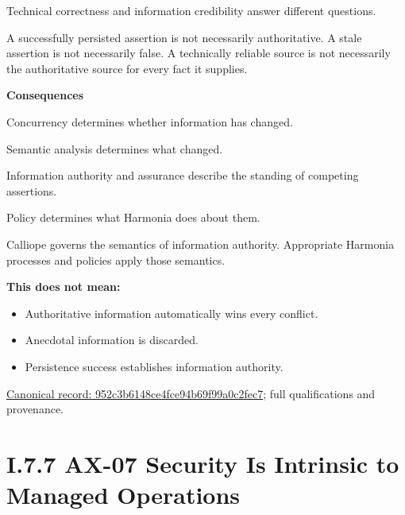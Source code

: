 Technical correctness and information credibility answer different
questions.



A successfully persisted assertion is not necessarily authoritative. A
stale assertion is not necessarily false. A technically reliable source
is not necessarily the authoritative source for every fact it supplies.



\par\medskip\textbf{Consequences}\par


Concurrency determines whether information has changed.



Semantic analysis determines what changed.



Information authority and assurance describe the standing of competing
assertions.



Policy determines what Harmonia does about them.



Calliope governs the semantics of information authority. Appropriate
Harmonia processes and policies apply those semantics.



\textbf{This does not mean:}



\begin{itemize}


\item Authoritative information automatically wins every conflict.

\item Anecdotal information is discarded.

\item Persistence success establishes information authority.

\end{itemize}

{\footnotesize \href{../../../../continuum/motivation/principle/952c3b6148ce4fce94b69f99a0c2fec7.md}{Canonical record: 952c3b6148ce4fce94b69f99a0c2fec7}; full qualifications and provenance.}\par
\section*{I.7.7 AX-07 Security Is Intrinsic to Managed Operations}
\label{navigation:I.7.7}

